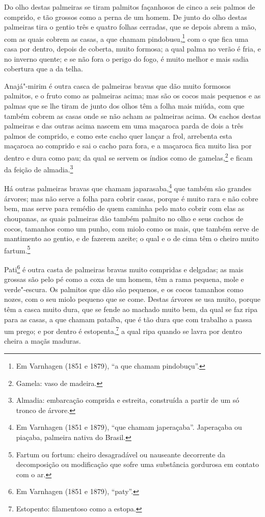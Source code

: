 Do olho destas palmeiras se tiram palmitos façanhosos de cinco a seis palmos de comprido,
e tão grossos como a perna de um homem. De junto do olho destas palmeiras tira o gentio
três e quatro folhas cerradas, que se depois abrem a mão, com as quais cobrem as casas, a
que chamam pindobusu,\footnote{ Em Varnhagen (1851 e 1879), ``a que chamam pindobuçu''.}
com o que fica uma casa por dentro, depois de coberta, muito formosa; a qual palma no
verão é fria, e no inverno quente; e se não fora o perigo do fogo, é muito melhor e mais
sadia cobertura que a da telha.

Anajá"-mirim é outra casca de palmeiras bravas que dão muito formosos palmitos, e o fruto
como as palmeiras acima; mas são os cocos mais pequenos e as palmas que se lhe tiram de
junto dos olhos têm a folha mais miúda, com que também cobrem as casas onde se não acham
as palmeiras acima. Os cachos destas palmeiras e das outras acima nascem em uma maçaroca
parda de dois a três palmos de comprido, e como este cacho quer lançar a frol, arrebenta
esta maçaroca ao comprido e sai o cacho para fora, e a maçaroca fica muito lisa por dentro
e dura como pau; da qual se servem os índios como de gamelas,\footnote{ Gamela: vaso de
madeira.} e ficam da feição de almadia.\footnote{ Almadia: embarcação comprida e estreita,
construída a partir de um só tronco de árvore.}

Há outras palmeiras bravas que chamam japarasaba,\footnote{ Em Varnhagen (1851 e 1879),
``que chamam japeraçaba''. Japeraçaba ou piaçaba, palmeira nativa do Brasil.} que também
são grandes árvores; mas não serve a folha para cobrir casas, porque é muito rara e não
cobre bem, mas serve para remédio de quem caminha pelo mato cobrir com elas as choupanas,
as quais palmeiras dão também palmito no olho e seus cachos de cocos, tamanhos como um
punho, com miolo como os mais, que também serve de mantimento ao gentio, e de fazerem
azeite; o qual e o de cima têm o cheiro muito fartum.\footnote{ Fartum ou fortum: cheiro
desagradável ou nauseante decorrente da decomposição ou modificação que sofre uma
substância gordurosa em contato com o ar.}

Pati\footnote{ Em Varnhagen (1851 e 1879), ``paty''.} é outra casta de palmeiras bravas
muito compridas e delgadas; as mais grossas são pelo pé como a coxa de um homem, têm a
rama pequena, mole e verde"-escura. Os palmitos que dão são pequenos, e os cocos tamanhos
como nozes, com o seu miolo pequeno que se come. Destas árvores se usa muito, porque têm a
casca muito dura, que se fende ao machado muito bem, da qual se faz ripa para as casas, a
que chamam pataíba, que é tão dura que com trabalho a passa um prego; e por dentro é
estopenta,\footnote{ Estopento: filamentoso como a estopa.} a qual ripa quando se lavra
por dentro cheira a maçãs maduras.


